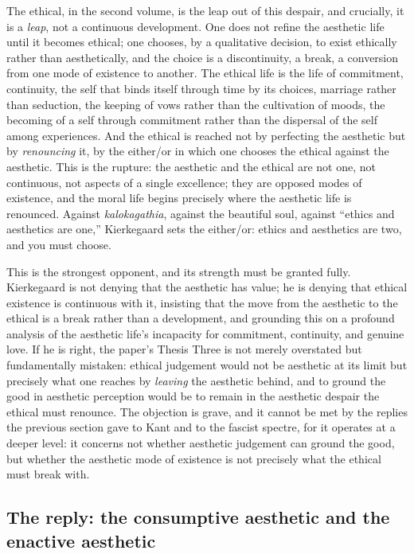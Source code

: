The ethical, in the second volume, is the leap out of this despair, and crucially, it is a \emph{leap}, not a continuous development. One does not refine the aesthetic life until it becomes ethical; one chooses, by a qualitative decision, to exist ethically rather than aesthetically, and the choice is a discontinuity, a break, a conversion from one mode of existence to another. The ethical life is the life of commitment, continuity, the self that binds itself through time by its choices, marriage rather than seduction, the keeping of vows rather than the cultivation of moods, the becoming of a self through commitment rather than the dispersal of the self among experiences. And the ethical is reached not by perfecting the aesthetic but by \emph{renouncing} it, by the either/or in which one chooses the ethical against the aesthetic. This is the rupture: the aesthetic and the ethical are not one, not continuous, not aspects of a single excellence; they are opposed modes of existence, and the moral life begins precisely where the aesthetic life is renounced. Against \emph{kalokagathia}, against the beautiful soul, against ``ethics and aesthetics are one,'' Kierkegaard sets the either/or: ethics and aesthetics are two, and you must choose.

This is the strongest opponent, and its strength must be granted fully. Kierkegaard is not denying that the aesthetic has value; he is denying that ethical existence is continuous with it, insisting that the move from the aesthetic to the ethical is a break rather than a development, and grounding this on a profound analysis of the aesthetic life's incapacity for commitment, continuity, and genuine love. If he is right, the paper's Thesis Three is not merely overstated but fundamentally mistaken: ethical judgement would not be aesthetic at its limit but precisely what one reaches by \emph{leaving} the aesthetic behind, and to ground the good in aesthetic perception would be to remain in the aesthetic despair the ethical must renounce. The objection is grave, and it cannot be met by the replies the previous section gave to Kant and to the fascist spectre, for it operates at a deeper level: it concerns not whether aesthetic judgement can ground the good, but whether the aesthetic mode of existence is not precisely what the ethical must break with.

\subsection{The reply: the consumptive aesthetic and the enactive aesthetic}
\label{p21:sub:cont-reply}

